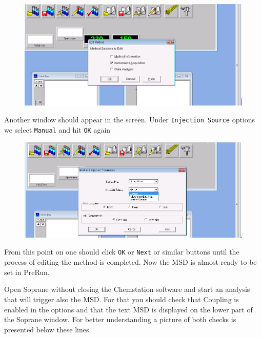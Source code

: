 \documentclass[31pt]{article}
\begin{document}
\begin{figure}[h]
\centering
\includegraphics[width=1.1\textwidth]{2Instrument_adq.png}
\label{fig:univerise}
\end{figure}

Another window should appear in the screen. Under \texttt{Injection Source} options we select \texttt{Manual} and hit \texttt{OK} again

\begin{figure}[h]
\centering
\includegraphics[width=1.1\textwidth]{3ManualStart.png}
\label{fig:univerise}
\end{figure}

From this point on one should click \texttt{OK} or \texttt{Next} or similar buttons until the process of editing the method is completed. Now the MSD is almost ready to be set in PreRun.

\newpage

Open Soprane without closing the Chemstation software and start an analysis that will trigger also the MSD. For that you should check that Coupling is enabled in the options and that the text MSD is displayed on the lower part of the Soprane window. For better understanding a picture of both checks is presented below these lines.
\end{document}
